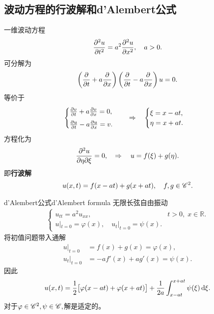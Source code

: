 \subsection{波动方程的行波解和d'Alembert公式}
一维波动方程
\[
	\frac{\partial^{2}u}{\partial t^{2}}=a^2\frac{\partial^{2}u}{\partial x^{2}},\quad a>0.
\]
可分解为
\[
	\kh{\pp t+a\pp x}\kh{\pp t-a\pp x}u=0.
\]
等价于
\begin{align*}
	\begin{cases}
		\pv vt+a\pv vx=0, \\[1ex]
		\pv ut-a\pv ux=v.
	\end{cases}
	\thus
	\begin{cases}
		\xi=x-at, \\
		\eta=x+at.
	\end{cases}
\end{align*}
方程化为
\[
	\frac{\partial^2 u}{\partial \eta\partial \xi}=0,\quad\Rightarrow\quad u=f(\xi)+g(\eta).
\]
即\textbf{行波解}
\begin{align}
	u(x,t)=f(x-at)+g(x+at),\quad f,g\in\mathscr C^2.
\end{align}
\begin{theorem}{d'Alembert公式}{d'Alembert formula}
	无限长弦自由振动
	\begin{align*}
		\begin{cases}
			u_{tt}=a^2u_{xx},&t>0,\;x\in\mathbb R. \\
			u|_{t=0}=\varphi(x),\quad u_t|_{t=0}=\psi(x).
		\end{cases}
	\end{align*}
	将初值问题带入通解
	\begin{align*}
		u|_{t=0}   & =f(x)+g(x)=\varphi(x),   \\
		u_t|_{t=0} & =-af'(x)+ag'(x)=\psi(x).
	\end{align*}
	因此
	\begin{align}
		u(x,t)=\frac12\bigl[\varphi(x-at)+\varphi(x+at)\bigr]+\frac1{2a}\int_{x-at}^{x+at}\psi(\xi)\mathop{}\!\mathrm{d}\xi.
	\end{align}
	对于$\varphi\in\mathscr C^2,\psi\in\mathscr C,$解是适定的。
\end{theorem}

